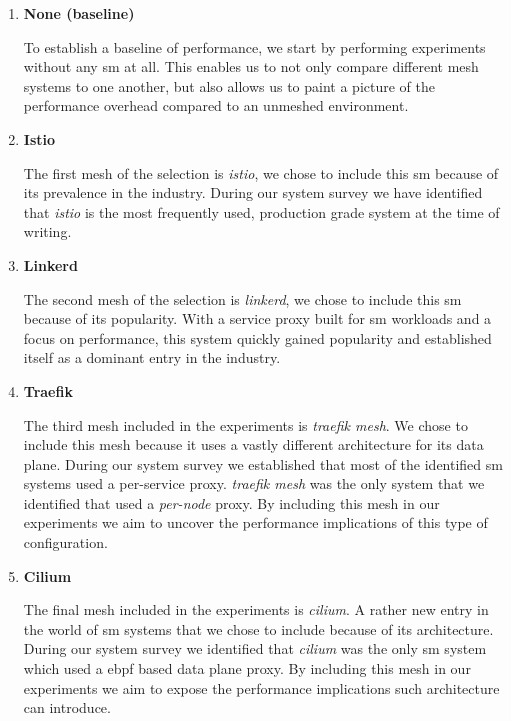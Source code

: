 \begin{enumerate}[label=\textbf{SM\arabic*}, leftmargin=3\parindent]
    \item \textbf{None (baseline)}
    \label{exp:sm:0}
    
    To establish a baseline of performance, we start by performing experiments without any \gls{sm} at all. This enables us to not only compare different mesh systems to one another, but also allows us to paint a picture of the performance overhead compared to an unmeshed environment.
    
    \item \textbf{Istio}
    \label{exp:sm:1}
   
    The first mesh of the selection is \textit{istio}, we chose to include this \gls{sm} because of its prevalence in the industry. During our system survey we have identified that \textit{istio} is the most frequently used, production grade system at the time of writing.
    
    \item \textbf{Linkerd}
    \label{exp:sm:2}
   
    The second mesh of the selection is \textit{linkerd}, we chose to include this \gls{sm} because of its popularity. With a service proxy built for \gls{sm} workloads and a focus on performance, this system quickly gained popularity and established itself as a dominant entry in the industry.

    \item \textbf{Traefik}
    \label{exp:sm:3}
    
    The third mesh included in the experiments is \textit{traefik mesh}. We chose to include this mesh because it uses a vastly different architecture for its data plane. During our system survey we established that most of the identified \gls{sm} systems used a per-service proxy. \textit{traefik mesh} was the only system that we identified that used a \textit{per-node} proxy. By including this mesh in our experiments we aim to uncover the performance implications of this type of configuration.
    
    \item \textbf{Cilium}
    \label{exp:sm:4}
    
    The final mesh included in the experiments is \textit{cilium}. A rather new entry in the world of \gls{sm} systems that we chose to include because of its architecture. During our system survey we identified that \textit{cilium} was the only \gls{sm} system which used a \gls{ebpf} based data plane proxy. By including this mesh in our experiments we aim to expose the performance implications such architecture can introduce.

\end{enumerate}


